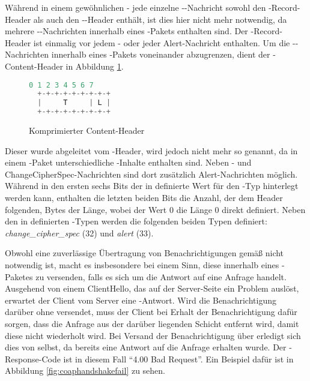 Während in einem gewöhnlichen - jede einzelne --Nachricht sowohl den -Record-Header als auch den
--Header enthält, ist dies hier nicht mehr notwendig, da mehrere --Nachrichten innerhalb eines -Pakets
enthalten sind. Der -Record-Header ist einmalig vor jedem - oder jeder Alert-Nachricht enthalten. Um die --Nachrichten
innerhalb eines -Pakets voneinander abzugrenzen, dient der -Content-Header in Abbildung \ref{fig:com_content_header}.

\begin{figure}[ht]
  \centering
  \begin{lstlisting}[language=c]
   0 1 2 3 4 5 6 7
  +-+-+-+-+-+-+-+-+
  |     T     | L |
  +-+-+-+-+-+-+-+-+
  \end{lstlisting}
  \caption{Komprimierter Content-Header}
  \label{fig:com_content_header}
\end{figure}

Dieser wurde abgeleitet vom -Header, wird jedoch nicht mehr so genannt, da in einem -Paket unterschiedliche -Inhalte
enthalten sind. Neben - und ChangeCipherSpec-Nachrichten sind dort zusätzlich Alert-Nachrichten möglich. Während in den ersten sechs Bits der in
 definierte Wert für den -Typ hinterlegt werden kann, enthalten die letzten beiden Bits die Anzahl, der dem Header folgenden,
Bytes der Länge, wobei der Wert 0 die Länge 0 direkt definiert. Neben den in  definierten -Typen werden die folgenden
beiden Typen definiert: \textit{change\_cipher\_spec} (32) und \textit{alert} (33).

Obwohl eine zuverlässige Übertragung von Benachrichtigungen gemäß  nicht notwendig ist, macht es insbesondere bei einem  Sinn, diese
innerhalb eines -Paketes zu versenden, falls es sich um die Antwort auf eine Anfrage handelt. Ausgehend von einem ClientHello, das
auf der Server-Seite ein Problem auslöst, erwartet der Client vom Server eine -Antwort. Wird die Benachrichtigung darüber ohne  versendet,
muss der Client bei Erhalt der Benachrichtigung dafür sorgen, dass die Anfrage aus der darüber liegenden  Schicht entfernt wird, damit diese
nicht wiederholt wird. Bei Versand der Benachrichtigung über  erledigt sich dies von selbst, da bereits eine Antwort auf die Anfrage erhalten wurde.
Der -Response-Code ist in diesem Fall "`4.00 Bad Request"'. Ein Beispiel dafür ist in Abbildung \ref{fig:coaphandshakefail} zu sehen.

